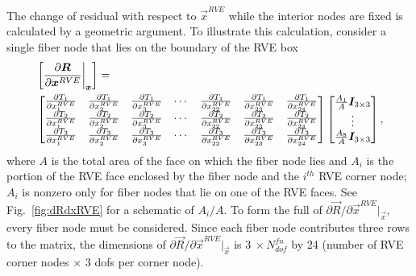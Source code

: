 The change of residual with respect to $\vec{x}^{RVE}$ while the interior nodes are fixed is calculated by a geometric argument. To illustrate this calculation, consider a single fiber node that lies on the boundary of the RVE box 
%
\begin{align}
&\left [\frac{\partial \vec{R}}{\partial \vec{x}^{RVE}}\bigg |_{\vec{x}}\right] = \nonumber\\
%
&\begin{bmatrix} 
\frac{\partial T_1}{\partial x_1^{RVE}} & \frac{\partial T_1}{\partial x_2^{RVE}} & \frac{\partial T_1}{\partial x_3^{RVE}} & \cdots & \frac{\partial T_1}{\partial x_{22}^{RVE}} & \frac{\partial T_1}{\partial x_{23}^{RVE}} & \frac{\partial T_1}{\partial x_{24}^{RVE}} \\
%
\frac{\partial T_2}{\partial x_1^{RVE}} & \frac{\partial T_2}{\partial x_2^{RVE}} & \frac{\partial T_2}{\partial x_3^{RVE}} & \cdots & \frac{\partial T_2}{\partial x_{22}^{RVE}} & \frac{\partial T_2}{\partial x_{23}^{RVE}} & \frac{\partial T_2}{\partial x_{24}^{RVE}} \\
%
\frac{\partial T_3}{\partial x_1^{RVE}} & \frac{\partial T_3}{\partial x_2^{RVE}} & \frac{\partial T_3}{\partial x_3^{RVE}} & \cdots & \frac{\partial T_3}{\partial x_{22}^{RVE}} & \frac{\partial T_3}{\partial x_{23}^{RVE}} & \frac{\partial T_3}{\partial x_{24}^{RVE}} \\
\end{bmatrix} \begin{bmatrix}
\frac{A_1}{A}\mat{I}_{3\times3} \\ \vdots \\ \frac{A_8}{A}\mat{I}_{3\times3}
\end{bmatrix},
\label{eq:dRdxRVE_1node}
\end{align}
%
where $A$ is the total area of the face on which the fiber node lies and $A_i$ is the portion of the RVE face enclosed by the fiber node and the $i^{th}$ RVE corner node; $A_i$ is nonzero only for fiber nodes that lie on one of the RVE faces. See Fig.\ \ref{fig:dRdxRVE} for a schematic of $A_i/A$. To form the full of $\partial \vec{R}/\partial \vec{x}^{RVE} |_{\vec{x}}$, every fiber node must be considered. Since each fiber node contributes three rows to the matrix, the dimensions of $\partial \vec{R}/\partial \vec{x}^{RVE} |_{\vec{x}}$ is $3 \ \times N_{dof}^{fn}$ by 24 (number of RVE corner nodes $\times$ 3 dofs per corner node).
%

